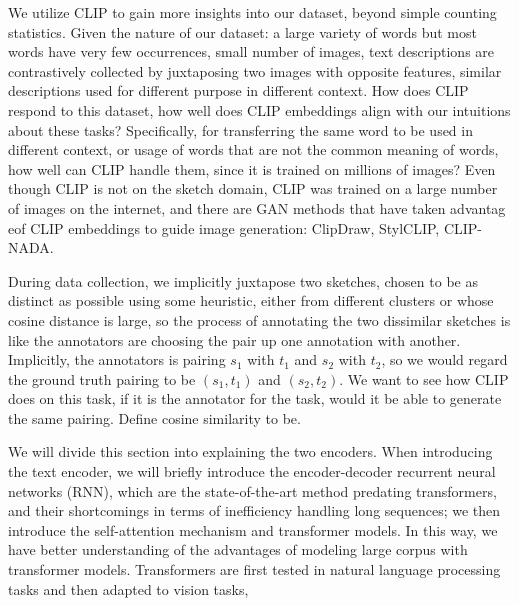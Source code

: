 We utilize CLIP to gain more insights into our dataset, beyond simple counting statistics. Given the nature of our dataset: a large variety of words but most words have very few occurrences, small number of images, text descriptions are contrastively collected by juxtaposing two images with opposite features, similar descriptions used for different purpose in different context. How does CLIP respond to this dataset, how well does CLIP embeddings align with our intuitions about these tasks? Specifically, for transferring the same word to be used in different context, or usage of words that are not the common meaning of words, how well can CLIP handle them, since it is trained on millions of images? Even though CLIP is not on the sketch domain, CLIP was trained on a large number of images on the internet, and there are GAN methods that have taken advantag eof CLIP embeddings to guide image generation: ClipDraw, StylCLIP, CLIP-NADA. 

During data collection, we implicitly juxtapose two sketches, chosen to be as distinct as possible using some heuristic, either from different clusters or whose cosine distance is large, so the process of annotating the two dissimilar sketches is like the annotators are choosing the pair up one annotation with another. 
Implicitly, the annotators is pairing $s_1$ with $t_1$ and $s_2$ with $t_2$, so we would regard the ground truth pairing to be $(s_1,t_1)$ and $(s_2,t_2)$. We want to see how CLIP does on this task, if it is the annotator for the task, would it be able to generate the same pairing. Define cosine similarity to be. 


We will divide this section into explaining the two encoders. When introducing the text encoder, we will briefly introduce the encoder-decoder recurrent neural networks (RNN), which are the state-of-the-art method predating transformers, and their shortcomings in terms of inefficiency handling long sequences; we then introduce the self-attention mechanism and transformer models. In this way, we have better understanding of the advantages of modeling large corpus with transformer models. 
Transformers are first tested in natural language processing tasks and then adapted to vision tasks,



